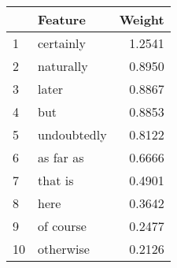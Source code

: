 \begin{tabular}{llr}
\toprule
{} &      Feature &  Weight \\
\midrule
1  &    certainly &  1.2541 \\
2  &    naturally &  0.8950 \\
3  &        later &  0.8867 \\
4  &          but &  0.8853 \\
5  &  undoubtedly &  0.8122 \\
6  &    as far as &  0.6666 \\
7  &      that is &  0.4901 \\
8  &         here &  0.3642 \\
9  &    of course &  0.2477 \\
10 &    otherwise &  0.2126 \\
\bottomrule
\end{tabular}
